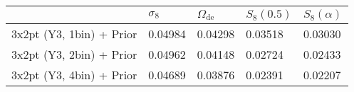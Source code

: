 \begin{tabular}{lllll}
\toprule
{} & $\sigma_8$ & $\Omega_\mathrm{de}$ & $S_8(0.5)$ & $S_8(\alpha)$ \\
\midrule
3x2pt (Y3, 1bin) + Prior &    0.04984 &              0.04298 &    0.03518 &       0.03030 \\
3x2pt (Y3, 2bin) + Prior &    0.04962 &              0.04148 &    0.02724 &       0.02433 \\
3x2pt (Y3, 4bin) + Prior &    0.04689 &              0.03876 &    0.02391 &       0.02207 \\
\bottomrule
\end{tabular}
